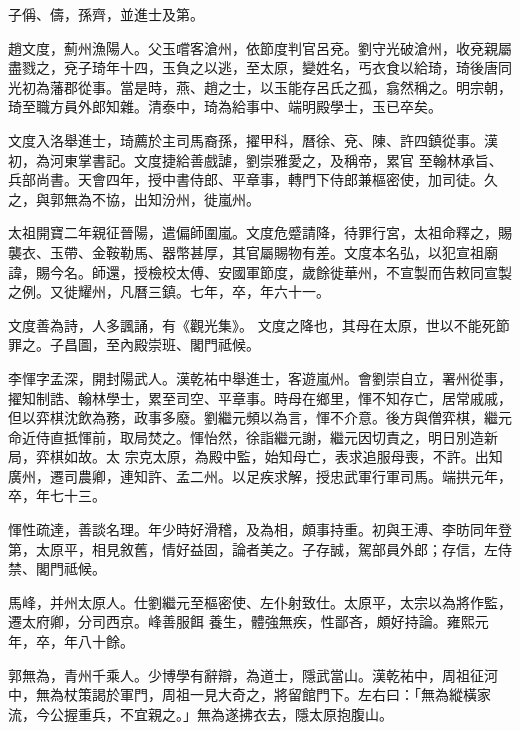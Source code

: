 \begin{pinyinscope}
 子偁、儔，孫齊，並進士及第。



 趙文度，薊州漁陽人。父玉嚐客滄州，依節度判官呂兗。劉守光破滄州，收兗親屬盡戮之，兗子琦年十四，玉負之以逃，至太原，變姓名，丐衣食以給琦，琦後唐同光初為藩郡從事。當是時，燕、趙之士，以玉能存呂氏之孤，翕然稱之。明宗朝，琦至職方員外郎知雜。清泰中，琦為給事中、端明殿學士，玉已卒矣。



 文度入洛舉進士，琦薦於主司馬裔孫，擢甲科，曆徐、兗、陳、許四鎮從事。漢初，為河東掌書記。文度捷給善戲謔，劉崇雅愛之，及稱帝，累官
 至翰林承旨、兵部尚書。天會四年，授中書侍郎、平章事，轉門下侍郎兼樞密使，加司徒。久之，與郭無為不協，出知汾州，徙嵐州。



 太祖開寶二年親征晉陽，遣偏師圍嵐。文度危蹙請降，待罪行宮，太祖命釋之，賜襲衣、玉帶、金鞍勒馬、器幣甚厚，其官屬賜物有差。文度本名弘，以犯宣祖廟諱，賜今名。師還，授檢校太傅、安國軍節度，歲餘徙華州，不宣製而告敕同宣製之例。又徙耀州，凡曆三鎮。七年，卒，年六十一。



 文度善為詩，人多諷誦，有《觀光集》。
 文度之降也，其母在太原，世以不能死節罪之。子昌圖，至內殿崇班、閣門祗候。



 李惲字孟深，開封陽武人。漢乾祐中舉進士，客遊嵐州。會劉崇自立，署州從事，擢知制誥、翰林學士，累至司空、平章事。時母在鄉里，惲不知存亡，居常戚戚，但以弈棋沈飲為務，政事多廢。劉繼元頻以為言，惲不介意。後方與僧弈棋，繼元命近侍直抵惲前，取局焚之。惲怡然，徐詣繼元謝，繼元因切責之，明日別造新局，弈棋如故。太
 宗克太原，為殿中監，始知母亡，表求追服母喪，不許。出知廣州，遷司農卿，連知許、孟二州。以足疾求解，授忠武軍行軍司馬。端拱元年，卒，年七十三。



 惲性疏達，善談名理。年少時好滑稽，及為相，頗事持重。初與王溥、李昉同年登第，太原平，相見敘舊，情好益固，論者美之。子存誠，駕部員外郎；存信，左侍禁、閣門祗候。



 馬峰，并州太原人。仕劉繼元至樞密使、左仆射致仕。太原平，太宗以為將作監，遷太府卿，分司西京。峰善服餌
 養生，體強無疾，性鄙吝，頗好持論。雍熙元年，卒，年八十餘。



 郭無為，青州千乘人。少博學有辭辯，為道士，隱武當山。漢乾祐中，周祖征河中，無為杖策謁於軍門，周祖一見大奇之，將留館門下。左右曰：「無為縱橫家流，今公握重兵，不宜親之。」無為遂拂衣去，隱太原抱腹山。




\end{pinyinscope}
